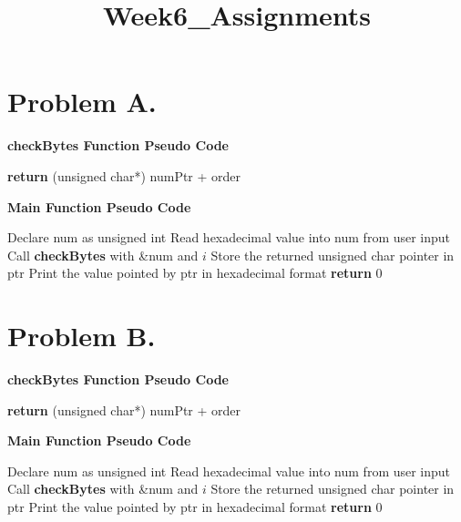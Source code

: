 \documentclass{article}
\title{Week6_Assignments}
\begin{document}
\section*{Problem A.}
\begin{algorithm}
\textbf{checkBytes Function Pseudo Code}  %
\begin{algorithmic}[1]
    \State \textbf{return} (unsigned char*) numPtr + order
\EndFunction
\end{algorithmic}
\end{algorithm}

\vspace{10pt}

\begin{algorithm}
\textbf{Main Function Pseudo Code}  %
\begin{algorithmic}[1]
\State Declare num as unsigned int
\State Read hexadecimal value into num from user input
  \\
    \State Call \textbf{checkBytes} with \&num and $i$
    \State Store the returned unsigned char pointer in ptr
    \State Print the value pointed by ptr in hexadecimal format
\EndFor
\State \textbf{return} 0 
\end{algorithmic}
\end{algorithm}

\section*{Problem B.}
\begin{algorithm}
\textbf{checkBytes Function Pseudo Code}  %
\begin{algorithmic}[1]
    \State \textbf{return} (unsigned char*) numPtr + order
\EndFunction
\end{algorithmic}
\end{algorithm}

\begin{algorithm}
\textbf{Main Function Pseudo Code}  %
\begin{algorithmic}[1]
\State Declare num as unsigned int
\State Read hexadecimal value into num from user input
  \\
    \State Call \textbf{checkBytes} with \&num and $i$
    \State Store the returned unsigned char pointer in ptr
    \State Print the value pointed by ptr in hexadecimal format
\EndFor
\State \textbf{return} 0 
\end{algorithmic}
\end{algorithm}
\end{document}
